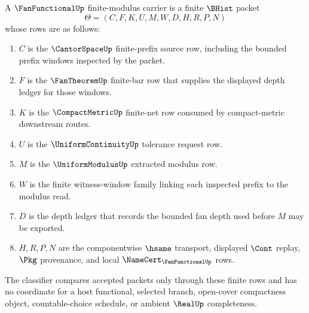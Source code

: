 \begin{definition}
\label{def:fan-functional-finite-modulus-carrier}
A $\FanFunctionalUp$ finite-modulus carrier is a finite $\BHist$ packet
$$
\Theta=(C,F,K,U,M,W,D,H,R,P,N)
$$
whose rows are as follows:
\begin{enumerate}
\item $C$ is the $\CantorSpaceUp$ finite-prefix source row, including the bounded prefix windows inspected by the packet.
\item $F$ is the $\FanTheoremUp$ finite-bar row that supplies the displayed depth ledger for those windows.
\item $K$ is the $\CompactMetricUp$ finite-net row consumed by compact-metric downstream routes.
\item $U$ is the $\UniformContinuityUp$ tolerance request row.
\item $M$ is the $\UniformModulusUp$ extracted modulus row.
\item $W$ is the finite witness-window family linking each inspected prefix to the modulus read.
\item $D$ is the depth ledger that records the bounded fan depth used before $M$ may be exported.
\item $H,R,P,N$ are the componentwise $\hsame$ transport, displayed $\Cont$ replay, $\Pkg$ provenance, and local $\NameCert_{\FanFunctionalUp}$ rows.
\end{enumerate}
The classifier compares accepted packets only through these finite rows and has no coordinate for a host functional, selected branch, open-cover compactness object, countable-choice schedule, or ambient $\RealUp$ completeness.
\end{definition}

